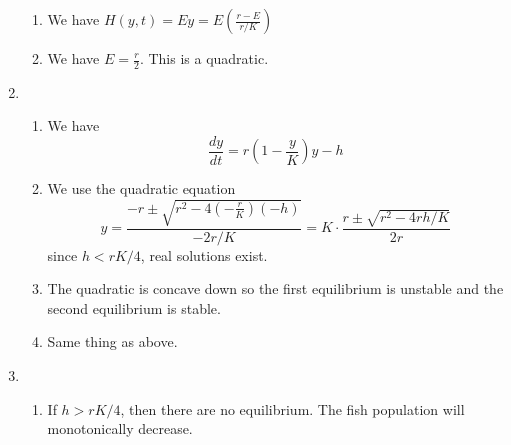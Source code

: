 \documentclass{article}
\begin{document}
\begin{enumerate}
\begin{enumerate}
                \item We have $H(y,t)=Ey = E\left(\frac{r-E}{r/K}\right)$
                \item We have $E=\frac{r}{2}$. This is a quadratic. 
            \end{enumerate}
            \item \begin{enumerate}
                \item We have 
                \begin{equation}
                    \frac{dy}{dt} = r\left(1-\frac{y}{K}\right)y - h
                \end{equation}
                \item We use the quadratic equation 
                \begin{equation}
                    y = \frac{-r \pm \sqrt{r^2-4\left(-\frac{r}{K}\right)(-h)}}{-2r/K} = K\cdot\frac{r \pm \sqrt{r^2-4rh/K}}{2r}
                \end{equation}
                since $h<rK/4$, real solutions exist.
                \item The quadratic is concave down so the first equilibrium is unstable and the second equilibrium is stable.
                \item Same thing as above.
            \end{enumerate}
            \item \begin{enumerate}
                \item If $h>rK/4$, then there are no equilibrium. The fish population will monotonically decrease.

\end{enumerate}
\end{enumerate}
\end{document}
